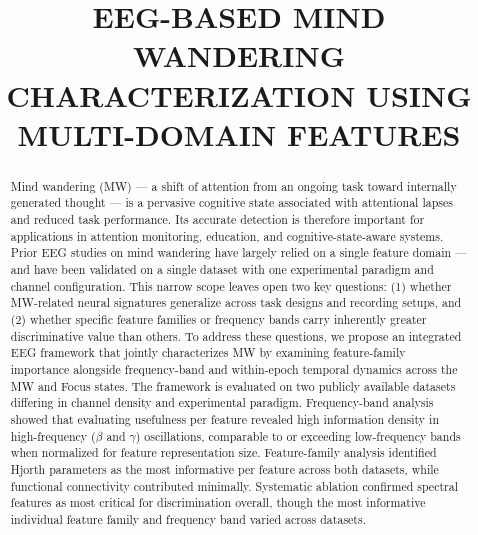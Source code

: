 \documentclass[conference]{IEEEtran}
\begin{document}
\title{EEG-BASED MIND WANDERING CHARACTERIZATION USING MULTI-DOMAIN FEATURES\vspace{-4mm}
}

\author{
}
\maketitle 
\begin{abstract}
Mind wandering (MW) — a shift of attention from an ongoing task toward internally generated thought — is a pervasive cognitive state associated with attentional lapses and reduced task performance. Its accurate detection is therefore important for applications in attention monitoring, education, and cognitive-state-aware systems. Prior EEG studies on mind wandering have largely relied on a single feature domain — and have been validated on a single dataset with one experimental paradigm and channel configuration. This narrow scope leaves open two key questions: (1) whether MW-related neural signatures generalize across task designs and recording setups, and (2) whether specific feature families or frequency bands carry inherently greater discriminative value than others. To address these questions, we propose an integrated EEG framework that jointly characterizes MW by examining feature-family importance alongside frequency-band and within-epoch temporal dynamics across the MW and Focus states. The framework is evaluated on two publicly available datasets differing in channel density and experimental paradigm. Frequency-band analysis showed that evaluating usefulness per feature revealed high information density in high-frequency ($\beta$ and $\gamma$) oscillations, comparable to or exceeding low-frequency bands when normalized for feature representation size. Feature-family analysis identified Hjorth parameters as the most informative per feature across both datasets, while functional connectivity contributed minimally. Systematic ablation confirmed spectral features as most critical for discrimination overall, though the most informative individual feature family and frequency band varied across datasets.

\end{abstract}
\end{document}

